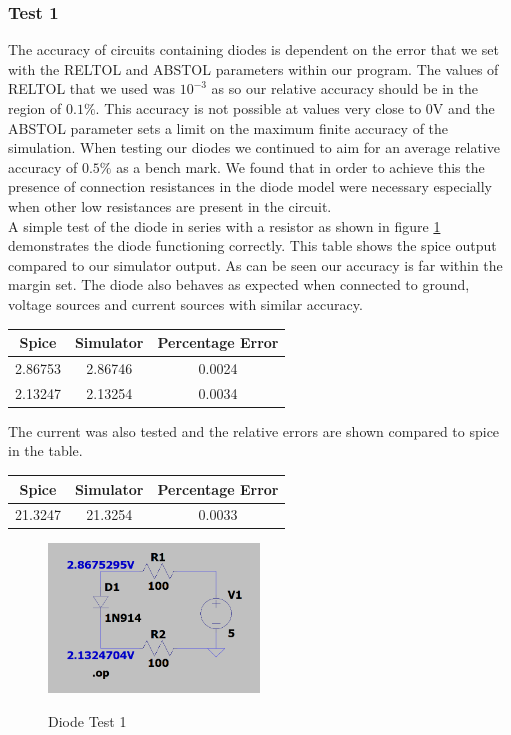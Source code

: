 \documentclass{article}
\begin{document}
\subsubsection{Test 1}
The accuracy of circuits containing diodes is dependent on the error that we set with the RELTOL and ABSTOL parameters within our program. The values of RELTOL that we used was $10^{-3}$ as so our relative accuracy should be in the region of $0.1\%$. This accuracy is not possible at values very close to 0V and the ABSTOL parameter sets a limit on the maximum finite accuracy of the simulation. When testing our diodes we continued to aim for an average relative accuracy of $0.5\%$ as a bench mark. We found that in order to achieve this the presence of connection resistances in the diode model were necessary especially when other low resistances are present in the circuit. \\
A simple test of the diode in series with a resistor as shown in figure \ref{fig:DiodeTest1} demonstrates the diode functioning correctly. This table shows the spice output compared to our simulator output. As can be seen our accuracy is far within the margin set. The diode also behaves as expected when connected to ground, voltage sources and current sources with similar accuracy.  
\begin{center}
\begin{tabular}{ ||c| c ||c ||}
\hline
 Spice & Simulator & Percentage Error \\ 
 \hline
 2.86753 & 2.86746 & 0.0024 \\  
 2.13247 & 2.13254 & 0.0034 \\   
 \hline
\end{tabular}
\end{center}
The current was also tested and the relative errors are shown compared to spice in the table.
\begin{center}
\begin{tabular}{ ||c| c ||c ||}
\hline
 Spice & Simulator & Percentage Error \\ 
 \hline
 21.3247 & 21.3254 & 0.0033 \\  
 \hline
\end{tabular}
\end{center}
\begin{figure}[h]
    \caption{Diode Test 1}
    \centering
    \includegraphics[width=0.5\textwidth]{images/DiodeTest1.png}
    \label{fig:DiodeTest1}
\end{figure}
\end{document}
